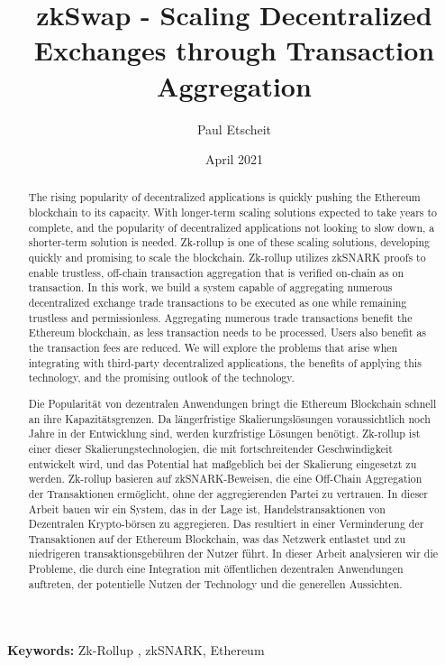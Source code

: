 \documentclass[11pt,a4paper,final]{article}
\title{zkSwap - Scaling Decentralized Exchanges through Transaction Aggregation}
\author{Paul Etscheit}
\date{April 2021}
\begin{document}
    \begin{titlepage}
        \maketitle
    \end{titlepage}

    \begin{abstract}
        The rising popularity of decentralized applications is quickly pushing the Ethereum blockchain to its capacity. With longer-term scaling solutions expected to take years to complete, and the popularity of decentralized applications not looking to slow down, a shorter-term solution is needed. Zk-rollup is one of these scaling solutions, developing quickly and promising to scale the blockchain. Zk-rollup utilizes zkSNARK proofs to enable trustless, off-chain transaction aggregation that is verified on-chain as on transaction. In this work, we build a system capable of aggregating numerous decentralized exchange trade transactions to be executed as one while remaining trustless and permissionless. Aggregating numerous trade transactions benefit the Ethereum blockchain, as less transaction needs to be processed. Users also benefit as the transaction fees are reduced. We will explore the problems that arise when integrating with third-party decentralized applications, the benefits of applying this technology, and the promising outlook of the technology. 
    \end{abstract}

    \begin{abstract}
        Die Popularität von dezentralen Anwendungen bringt die Ethereum Blockchain schnell an ihre Kapazitätsgrenzen. Da längerfristige Skalierungslösungen voraussichtlich noch Jahre in der Entwicklung sind, werden kurzfristige Lösungen benötigt. Zk-rollup ist einer dieser Skalierungstechnologien, die mit fortschreitender Geschwindigkeit entwickelt wird, und das Potential hat maßgeblich bei der Skalierung eingesetzt zu werden. Zk-rollup basieren auf zkSNARK-Beweisen, die eine Off-Chain Aggregation der Transaktionen ermöglicht, ohne der aggregierenden Partei zu vertrauen. In dieser Arbeit bauen wir ein System, das in der Lage ist, Handelstransaktionen von Dezentralen Krypto-börsen zu aggregieren. Das resultiert in einer Verminderung der Transaktionen auf der Ethereum Blockchain, was das Netzwerk entlastet und zu niedrigeren transaktionsgebühren der Nutzer führt. In dieser Arbeit analysieren wir die Probleme, die durch eine Integration mit öffentlichen dezentralen Anwendungen auftreten, der potentielle Nutzen der Technology und die generellen Aussichten.
    \end{abstract}
    {\bf Keywords:} Zk-Rollup , zkSNARK, Ethereum
\end{document}
